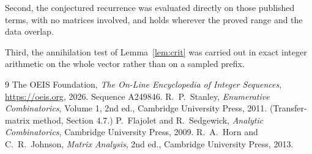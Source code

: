 \documentclass[11pt,a4paper]{article}
\theoremstyle{plain}
\theoremstyle{definition}
\begin{document}
Second, the conjectured recurrence was evaluated directly on those published terms, with no
matrices involved, and holds wherever the proved range and the data overlap.

Third, the annihilation test of Lemma~\ref{lem:crit} was carried out in exact integer
arithmetic on the whole vector rather than on a sampled prefix.

\begin{thebibliography}{9}
 The OEIS Foundation, \emph{The On-Line Encyclopedia of Integer
Sequences}, \url{https://oeis.org}, 2026. Sequence A249846.
 R.~P.~Stanley, \emph{Enumerative Combinatorics}, Volume 1, 2nd ed.,
Cambridge University Press, 2011. (Transfer-matrix method, Section 4.7.)
 P.~Flajolet and R.~Sedgewick, \emph{Analytic Combinatorics}, Cambridge
University Press, 2009.
 R.~A.~Horn and C.~R.~Johnson, \emph{Matrix Analysis}, 2nd ed., Cambridge
University Press, 2013.
\end{thebibliography}
\end{document}
